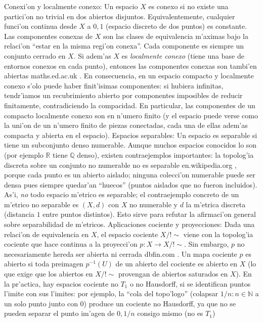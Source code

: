 \documentclass[a4paper,11pt]{article}  %
\begin{document}
Conexi'on y localmente conexo: Un espacio $X$ es conexo si no existe una partici'on no trivial en dos abiertos disjuntos. Equivalentemente, cualquier funci'on continua desde $X$ a ${0,1}$ (espacio discreto de dos puntos) es constante. Las componentes conexas de $X$ son las clases de equivalencia m'aximas bajo la relaci'on “estar en la misma regi'on conexa”. Cada componente es siempre un conjunto cerrado en $X$. Si adem'as $X$ es \emph{localmente conexo} (tiene una base de entornos conexos en cada punto), entonces las componentes conexas son tambi'en abiertas
maths.ed.ac.uk
. En consecuencia, en un espacio compacto y localmente conexo s'olo puede haber finit'isimas componentes: si hubiera infinitas, tendr'iamos un recubrimiento abierto por componentes imposibles de reducir finitamente, contradiciendo la compacidad. En particular, las componentes de un compacto localmente conexo son en n'umero finito (y el espacio puede verse como la uni'on de un n'umero finito de piezas conectadas, cada una de ellas adem'as compacta y abierta en el espacio).
Espacios separables: Un espacio es separable si tiene un subconjunto denso numerable. Aunque muchos espacios conocidos lo son (por ejemplo $\mathbb{R}$ tiene $\mathbb{Q}$ denso), existen contraejemplos importantes: la topolog'ia discreta sobre un conjunto no numerable no es separable
en.wikipedia.org
, porque cada punto es un abierto aislado; ninguna colecci'on numerable puede ser densa pues siempre quedar'an “huecos” (puntos aislados que no fueron incluidos). As'i, \emph{no} todo espacio m'etrico es separable; el contraejemplo concreto de un m'etrico no separable es $(X,d)$ con $X$ no numerable y $d$ la m'etrica discreta (distancia $1$ entre puntos distintos). Esto sirve para refutar la afirmaci'on general sobre separabilidad de m'etricos.
Aplicaciones cociente y proyecciones: Dada una relaci'on de equivalencia en $X$, el espacio cociente $X/!\sim$ viene con la topolog'ia cociente que hace continua a la proyecci'on $p: X\to X/!\sim$. Sin embargo, $p$ no necesariamente hereda ser abierta ni cerrada
dbfin.com
. Un mapa cociente $p$ es abierto si toda preimagen $p^{-1}(U)$ de un abierto del cociente es abierto en $X$ (lo que exige que los abiertos en $X/!\sim$ provengan de abiertos saturados en $X$). En la pr'actica, hay espacios cociente no $T_1$ o no Hausdorff, si se identifican puntos l'imite con sus l'imites: por ejemplo, la “cola del topo'logo” (colapsar ${1/n: n\in\mathbb{N}}$ a un solo punto junto con $0$) produce un cociente no Hausdorff, ya que no se pueden separar el punto im'agen de ${0,1/n}$ consigo mismo (no es $T_1$)
\end{document}
